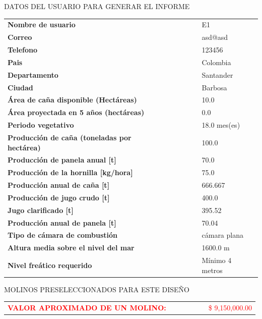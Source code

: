 \documentclass{article}%
\begin{document}
\newpage%
\begin{center}%
\begin{Huge}%
DATOS DEL USUARIO PARA GENERAR EL INFORME%
\end{Huge}%
\linebreak%
\end{center}%
\begin{tabular}{lccccl}%
\textbf{Nombre de usuario}& & & & &E1\\%
\textbf{Correo}& & & & &asd@asd\\%
\textbf{Telefono}& & & & &123456\\%
\textbf{Pais}& & & & &Colombia\\%
\textbf{Departamento}& & & & &Santander\\%
\textbf{Ciudad}& & & & &Barbosa\\%
\textbf{Área de caña disponible (Hectáreas)}& & & & &10.0\\%
\textbf{Área proyectada en 5 años (hectáreas)}& & & & &0.0\\%
\textbf{Periodo vegetativo}& & & & &18.0 mes(es)\\%
\textbf{Producción de caña (toneladas por hectárea)}& & & & &100.0\\%
\textbf{Producción de panela anual {[}t{]}}& & & & &70.0\\%
\textbf{Producción de la hornilla {[}kg/hora{]}}& & & & &75.0\\%
\textbf{Producción anual de caña {[}t{]}}& & & & &666.667\\%
\textbf{Producción de jugo crudo {[}t{]}}& & & & &400.0\\%
\textbf{Jugo clarificado {[}t{]}}& & & & &395.52\\%
\textbf{Producción anual de panela {[}t{]}}& & & & &70.04\\%
\textbf{Tipo de cámara de combustión}& & & & &cámara plana\\%
\textbf{Altura media sobre el nivel del mar}& & & & &1600.0 m\\%
\textbf{Nivel freático requerido}& & & & &Mínimo 4 metros\\%
\end{tabular}%
\newpage%
\begin{center}%
\begin{Huge}%
MOLINOS PRESELECCIONADOS PARA ESTE DISEÑO%
\end{Huge}%
\linebreak%
\end{center}%
\begin{tabular}{lcccccl}%
\textcolor{red}{ 
\textbf{VALOR APROXIMADO DE UN MOLINO: }
}& & & & & &\textcolor{red}{ 
\$ 9,150,000.00
}\\%
\end{tabular}%
\end{document}
